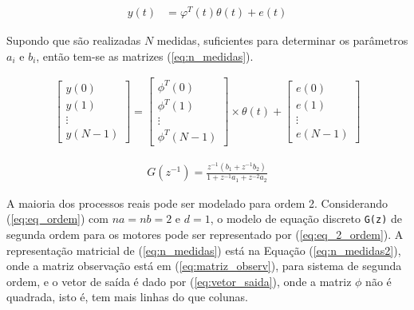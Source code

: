\begin{equation}
	\label{eq:eq_matr_ordem}
	\begin{split}
	y(t) &= \varphi^{T}(t)\theta(t) + e(t)
	\end{split}
\end{equation}

	Supondo que são realizadas $N$ medidas, suficientes para determinar os parâmetros $a_i$ e $b_i$, então tem-se as matrizes (\ref{eq:n_medidas}).
	
	
	\begin{equation}
\label{eq:n_medidas}
	\begin{split}
 \left[ \begin{array}{c} y(0) \\ y(1) \\ \vdots \\ y(N-1) \end{array} \right]  = \left[ \begin{array}{c} \phi^{T}(0) \\ \phi^{T}(1) \\ \vdots \\ \phi^{T}(N-1) \end{array} \right] \times \theta(t) + \left[ \begin{array}{c} e(0) \\ e(1) \\ \vdots \\ e(N-1) \end{array} \right]
	\end{split}
\end{equation}

\begin{equation}
\label{eq:eq_2_ordem}
	\begin{split}
G(z^{-1}) = \frac{z^{-1}(b_1 + z^{-1}b_2)}{1 + z^{-1}a_1 + z^{-2}a_2}
	\end{split}
\end{equation}

	A maioria dos processos reais pode ser modelado para ordem 2. Considerando (\ref{eq:eq_ordem}) com $na = nb = 2 $ e $d = 1$, o modelo de equação discreto \texttt{G(z)} de segunda ordem para os motores pode ser representado por (\ref{eq:eq_2_ordem}). A representação matricial de (\ref{eq:n_medidas}) está na Equação (\ref{eq:n_medidas2}), onde a matriz observação está em (\ref{eq:matriz_observ}), para sistema de segunda ordem, e o vetor de saída é dado por (\ref{eq:vetor_saida}), onde a matriz $\phi$ não é quadrada, isto é, tem mais linhas do que colunas.
	
